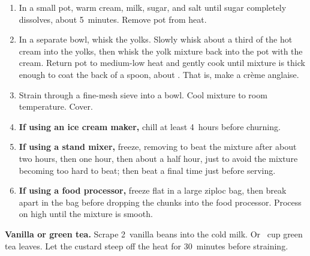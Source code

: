 

\begin{ingredients}
\end{ingredients}


\begin{recipe}
  \begin{enumerate}

  \item In a small pot, warm cream, milk, sugar, and salt until
    sugar completely dissolves, about 5~minutes.  Remove pot from
    heat.

  \item In a separate bowl, whisk the yolks.  Slowly whisk about a
    third of the hot cream into the yolks, then whisk the yolk mixture
    back into the pot with the cream. Return pot to medium-low heat
    and gently cook until mixture is thick enough to coat the back of
    a spoon, about .  That is, make a crème anglaise.

  \item Strain through a fine-mesh sieve into a bowl. Cool mixture to
    room temperature. Cover.

  \item \textbf{If using an ice cream maker,} chill at least 4~hours
    before churning.

  \item \textbf{If using a stand mixer,} freeze, removing to beat the
    mixture after about two hours, then one hour, then about a half
    hour, just to avoid the mixture becoming too hard to beat; then
    beat a final time just before serving.

  \item \textbf{If using a food processor,} freeze flat in a large
    ziploc bag, then break apart in the bag before dropping the chunks
    into the food processor.  Process on high until the mixture is
    smooth.

  \end{enumerate}
\end{recipe}


\textbf{Vanilla or green tea.}  Scrape 2~vanilla beans into
the cold milk.  Or \fracQ~cup green tea leaves.  Let the custard steep
off the heat for 30~minutes before straining.

